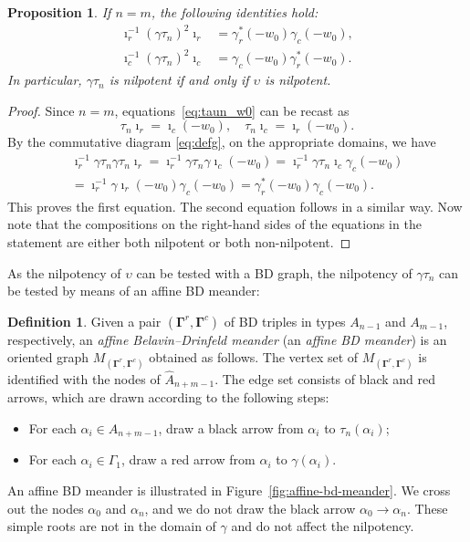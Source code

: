 \documentclass[11pt]{article}
\newcommand{\bg}{\mathbf{\Gamma}}
\newtheorem{proposition}[theorem]{Proposition}%
\theoremstyle{definition}\newtheorem{definition}[theorem]{Definition}
\theoremstyle{definition}\newtheorem{remark}[theorem]{Remark}
\theoremstyle{remark}
\numberwithin{equation}{section}
\begin{document}
\begin{proposition}
    If $n = m$, the following identities hold:
    \begin{align*}
        \imath_r^{-1}(\gamma \tau_n)^2\imath_r &=  \gamma_r^*(-w_0)\gamma_c(-w_0), \\
        \imath_c^{-1}(\gamma \tau_n)^2\imath_c &=  \gamma_c(-w_0)\gamma^*_r(-w_0).
    \end{align*}
    In particular, $\gamma\tau_n$ is nilpotent if and only if $\upsilon$ is nilpotent. 
\end{proposition}

\begin{proof}
Since $n=m$, equations~\eqref{eq:taun_w0} can be recast as 
\begin{equation*}
    \tau_n \imath_r = \imath_c(-w_0), \quad \tau_n \imath_c = \imath_r(-w_0).
\end{equation*}
By the commutative diagram \eqref{eq:defg}, on the appropriate domains, we have
\begin{equation*}\begin{split}
    \imath_r^{-1}\gamma \tau_n \gamma \tau_n \imath_r = \imath_r^{-1}\gamma \tau_n \gamma \imath_c(-w_0) = \imath_r^{-1}\gamma \tau_n \imath_c \gamma_c(-w_0)  \\ = \imath_r^{-1}\gamma \imath_r(-w_0) \gamma_c(-w_0) = \gamma_r^*(-w_0)\gamma_c(-w_0).
    \end{split}
\end{equation*}
This proves the first equation. The second equation follows in a similar way. Now note that the compositions on the right-hand sides of
the equations in the statement are either both nilpotent or both non-nilpotent.
\end{proof}

As the nilpotency of $\upsilon$ can be tested with a BD graph, the nilpotency of $\gamma\tau_n$ can be tested by means of an affine BD meander:

\begin{definition}
    Given a pair $(\bg^r,\bg^c)$ of BD triples in types $A_{n-1}$ and $A_{m-1}$, respectively, an \emph{affine Belavin--Drinfeld meander} (an \emph{affine BD meander}) is an oriented graph $M_{(\bg^r,\bg^c)}$ obtained as follows. The vertex set of $M_{(\bg^r,\bg^c)}$ is identified with the nodes of $\hat{A}_{n+m-1}$. The edge set consists of black and red arrows, which are drawn according to the following steps:
    \begin{itemize}
        \item For each $\alpha_i \in A_{n+m-1}$, draw a black arrow from $\alpha_i$ to $\tau_n(\alpha_i)$;
        \item For each $\alpha_i \in \Gamma_1$, draw a red arrow from $\alpha_i$ to $\gamma(\alpha_i)$.
    \end{itemize}
\end{definition}
 An affine BD meander is illustrated in Figure~\ref{fig:affine-bd-meander}. We cross out the nodes $\alpha_0$ and $\alpha_n$, and we do not draw the black arrow $\alpha_0 \rightarrow \alpha_n$. These simple roots are not in the domain of $\gamma$ and do not affect the nilpotency. 
 
\end{document}
